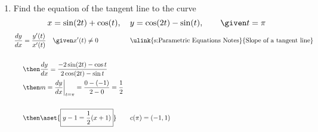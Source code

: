 \begin{enumerate}
\begin{enumerate}[itemsep=16em]
      \vspace{-13em}
      \item The circle of radius \(5\) centered at \((1,7)\).
        \begin{align*}
          c(t) &= (a + R \cos \theta , b + R \sin \theta) \quad
          \given \text{ \ulink{s:Parametric Equations Notes}{Parametrization of a circle} }\\
          \\
          \then c(t) &= (1 + 5 \cos \theta, 7 + 5 \sin \theta) \in \left[ 0, 2\pi \right)
        \end{align*}

      \vspace{-10em}
      \item The ellipse
        \[%
          \left( \frac{x-1}{2} \right)^2 + \left(\frac{y+1}{3}\right)^2 = 1
        \]%
        \begin{align*}
          c(\theta) &= (a \cos \theta , b \sin \theta)
                    && \text{ \ulink{s:Parametric Equations Notes}{Parametrization of a ellipse} }\\
                    \\
          c(\theta) &= (2 \cos \theta, 3 \sin \theta)
                    && \given \left( \frac{x}{2} \right)^2 + \left( \frac{y}{3} \right)^2 = 1 \\
          c(\theta) &= \aset{\boxed{(1 + 2 \cos \theta, -1 + 3 \sin \theta)}}
                    && \given \left( \frac{x-1}{2} \right)^2 + \left( \frac{y+1}{3} \right)^2 = 1
        \end{align*}
    \end{enumerate}

\newpage %

  \item Find the equation of the tangent line to the curve
    \[%
    x = \sin (2t) + \cos (t), \quad y = \cos (2t) - \sin (t), \qquad \given t
    = \pi
    \]%
    \begin{align*}
      \frac{dy}{dx} &= \frac{y'(t)}{x'(t)} \quad \given x'(t) \neq 0
     &&\text{\ulink{s:Parametric Equations Notes}{Slope of a tangent line}} \\
     \\
     &\then \frac{dy}{dx} = \frac{-2\sin(2t) - \cos t}{2\cos(2t) - \sin t} \\
     &\then m = \frac{dy}{dx} \bigg|_{t=\pi} = \frac{0 - (-1)}{2 - 0} = \frac{1}{2}\\
     \\
     &\then \aset{\boxed{y - 1 = \frac{1}{2}(x+1)}}
      && c(\pi) = (-1, 1)\\
    \end{align*}


\end{enumerate}
